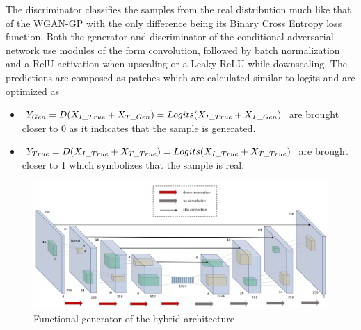\documentclass{Configuration_Files/PoliMi3i_thesis}
\begin{document}
The discriminator classifies the samples from the real distribution much like that of 
the WGAN-GP with the only difference being its Binary Cross Entropy loss function.
Both the generator and discriminator of the conditional adversarial network use 
modules of the form convolution, followed by batch normalization and a RelU activation 
when upscaling or a Leaky ReLU while downscaling. The predictions are composed as patches 
which are calculated similar to logits and are optimized as 
\begin{itemize}
\item $Y_{Gen} = D(X_{I\char`_True}+X_{T\char`_Gen}) = Logits(X_{I\char`_True}+X_{T\char`_Gen})$ are brought closer to 0 as it indicates that the
sample is generated.
\item $Y_{True} = D(X_{I\char`_True}+X_{T\char`_True}) = Logits(X_{I\char`_True}+X_{T\char`_True})$ are brought closer to 1 which symbolizes that the sample is real. 
\end{itemize}
\begin{figure}[H]
    \centering
    \includegraphics[width=1\textwidth]{unet.jpg}
    \caption{Functional generator of the hybrid architecture}
    \label{fig:unet}
\end{figure}
\end{document}
